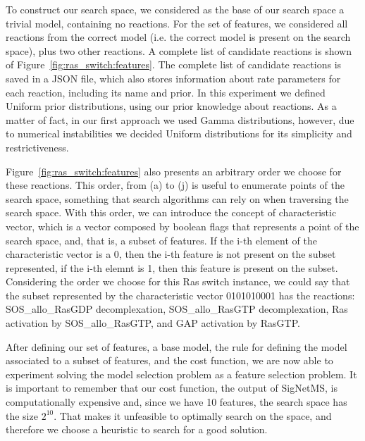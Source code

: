 To construct our search space, we considered as the base of our search
space a trivial model, containing no reactions. For the set of features,
we considered all reactions from the correct model (i.e. the correct
model is present on the search space), plus two other reactions. A
complete list of candidate reactions is shown of
Figure~\ref{fig:ras_switch:features}. The complete list of candidate
reactions is saved in a JSON file, which also stores information about
rate parameters for each reaction, including its name and prior. In this
experiment we defined Uniform prior distributions, using our prior
knowledge about reactions. As a matter of fact, in our first approach we
used Gamma distributions, however, due to numerical instabilities we
decided Uniform distributions for its simplicity and restrictiveness.

Figure~\ref{fig:ras_switch:features} also presents an arbitrary order we
choose for these reactions. This order, from (a) to (j) is useful to
enumerate points of the search space, something that search algorithms
can rely on when traversing the search space. With this order, we can
introduce the concept of characteristic vector, which is a vector
composed by boolean flags that represents a point of the search space,
and, that is, a subset of features. If the i-th element of the
characteristic vector is a 0, then the i-th feature is not present on 
the subset represented, if the i-th elemnt is 1, then this feature is
present on the subset. Considering the order we choose for this Ras
switch instance, we could say that the subset represented by the
characteristic vector 0101010001 has the reactions: SOS\_allo\_RasGDP
decomplexation, SOS\_allo\_RasGTP decomplexation, Ras activation by
SOS\_allo\_RasGTP, and GAP activation by RasGTP.

After defining our set of features, a base model, the rule for 
defining the model associated to a subset of features, and the cost
function, we are now able to experiment solving the model selection
problem as a feature selection problem. It is important to remember that
our cost function, the output of SigNetMS, is computationally expensive
and, since we have 10 features, the search space has the size $2^{10}$.
That makes it unfeasible to optimally search on the space, and therefore
we choose a heuristic to search for a good solution.


